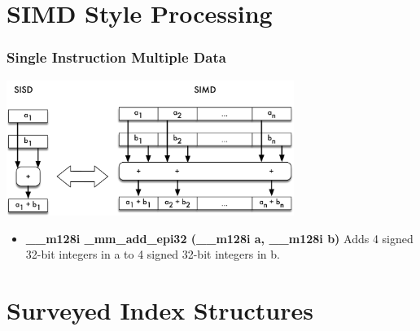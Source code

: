 \documentclass{beamer}
\begin{document}
\section{SIMD Style Processing}
\begin{frame}
\frametitle{Single Instruction Multiple Data}
\begin{center}
	\includegraphics[width=0.7\textwidth]{img/simd.pdf}
\end{center}
\begin{itemize}
	\item \textbf{\_\_m128i \_mm\_add\_epi32 (\_\_m128i a, \_\_m128i b)} Adds  4 signed 32-bit integers in a to 4 signed 32-bit integers
	in b.
\end{itemize}
\end{frame}
\section{Surveyed Index Structures}
\end{document}

